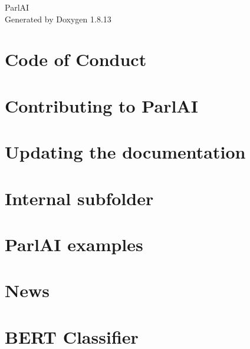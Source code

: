 \documentclass[twoside]{book}
\newcommand{\+}{\discretionary{\mbox{\scriptsize$\hookleftarrow$}}{}{}}
\newcommand{\clearemptydoublepage}{%
  \newpage{\pagestyle{empty}\cleardoublepage}%
}
\begin{document}
\hypersetup{pageanchor=false,
             bookmarksnumbered=true,
             pdfencoding=unicode
            }
\begin{titlepage}
\vspace*{7cm}
\begin{center}%
{\Large Parl\+AI }\\
\vspace*{1cm}
{\large Generated by Doxygen 1.8.13}\\
\end{center}
\end{titlepage}
\clearemptydoublepage
{}
\tableofcontents
\clearemptydoublepage
{}
\hypersetup{pageanchor=true}

\chapter{Code of Conduct}
\label{md_CODE_OF_CONDUCT}

\chapter{Contributing to Parl\+AI}
\label{md_CONTRIBUTING}

\chapter{Updating the documentation}
\label{md_docs_README}

\chapter{Internal subfolder}
\label{md_example_parlai_internal_README}

\chapter{Parl\+AI examples}
\label{md_examples_README}

\chapter{News}
\label{md_NEWS}

\chapter{B\+E\+RT Classifier}
\label{md_parlai_agents_bert_classifier_README}

\end{document}
